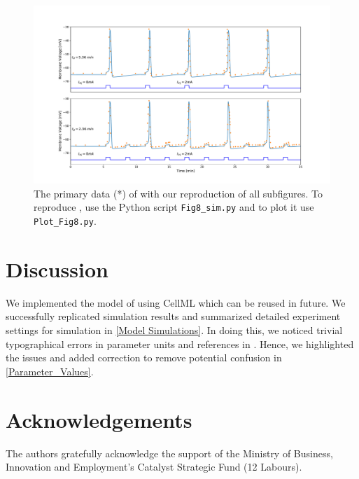 \documentclass[fleqn,10pt]{physiome}
\begin{document}
\begin{figure}[ht!]%
\includegraphics[width=1.0\linewidth]{Figure_8.pdf}
\caption{The primary data (*) of \cite[Figure 8A]{imtiaz2002theoretical} with our reproduction of all subfigures. To reproduce \cite[Figure 8A]{imtiaz2002theoretical}, use the Python script \texttt{Fig8\_sim.py} and to plot it use \texttt{Plot\_Fig8.py}.}
\label{fig:fig8}
\end{figure}
\section{Discussion}
We implemented the model of \cite{imtiaz2002theoretical} using CellML which can be reused in future. We successfully replicated simulation results and summarized detailed experiment settings for simulation in \autoref{Model Simulations}.
In doing this, we noticed trivial typographical errors in parameter units and references in \cite[Table 1, 3]{imtiaz2002theoretical}. Hence, we highlighted the issues and added correction to remove potential confusion in \autoref{Parameter_Values}.

\section{Acknowledgements}
The authors gratefully acknowledge the support of the Ministry of Business, Innovation and Employment’s
Catalyst Strategic Fund (12 Labours).


\end{document}

